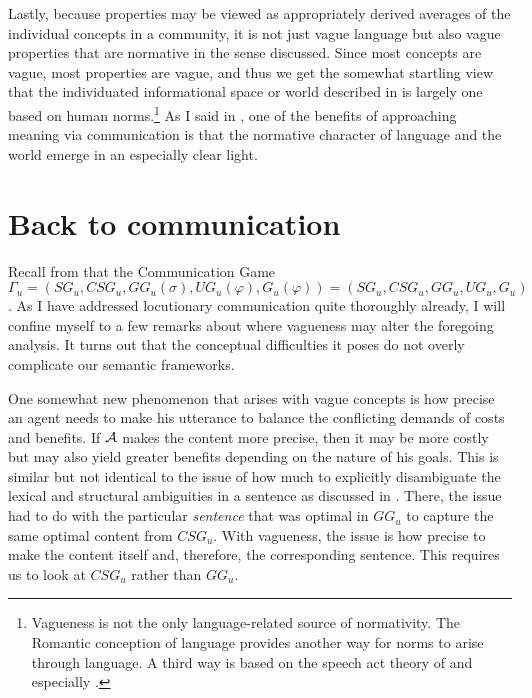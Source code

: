 Lastly, because properties may be viewed as appropriately derived averages of the individual concepts in a community, it is not just vague language but also vague properties that are normative in the sense discussed. Since most concepts are vague, most properties are vague, and thus we get the somewhat startling view that the individuated informational space or world described in  is largely one based on human norms.\footnote{Vagueness is not the only language-related source of normativity. The Romantic conception of language provides another way for norms to arise through language. A third way is based on the speech act theory of \citet{austin:htdtww} and especially \citet{habermas:wup, habermas:ctm}.} As I said in , one of the benefits of approaching meaning via communication is that the normative character of language and the world emerge in an especially clear light.


\section{Back to communication} \label{sec:back to communication}

Recall from  that the Communication Game $\Gamma_u = (SG_u, CSG_u, GG_u(\sigma),\allowbreak UG_u(\varphi), G_u(\varphi)) = (SG_u, CSG_u, GG_u, UG_u, G_u)$. As I have addressed locutionary communication quite thoroughly already, I will confine myself to a few remarks about where vagueness may alter the foregoing analysis. It turns out that the conceptual difficulties it poses do not overly complicate our semantic frameworks. 

One somewhat new phenomenon that arises with vague concepts is how precise an agent needs to make his utterance to balance the conflicting demands of costs and benefits. If $\cal A$ makes the content more precise, then it may be more costly but may also yield greater benefits depending on the nature of his goals. This is similar but not identical to the issue of how much to explicitly disambiguate the lexical and structural ambiguities in a sentence as discussed in . There, the issue had to do with the particular \emph{sentence} that was optimal in $GG_u$ to capture the same optimal content from $CSG_u$. With vagueness, the issue is how precise to make the content itself and, therefore, the corresponding sentence. This requires us to look at $CSG_u$ rather than $GG_u$.

